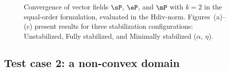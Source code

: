 \begin{figure}[h!]
	\centering
	\caption{Convergence of vector fields $\sP$, $\eP$, and $\mP$ with $k=2$ in the equal-order formulation, evaluated in the $\text{Hdiv}$-norm. Figures~(a)--(c) present results for three stabilization configurations: Unstabilized, Fully stabilized, and Minimally stabilized ($\alpha$, $\eta$).}
	\def\svgwidth{1.0\columnwidth}
	
	\label{fig:convergence_vector_cubic_hdiv}
\end{figure}


\cleardoublepage
\newpage
\subsection{Test case 2: a non-convex domain}\label{sec:test_case2}

